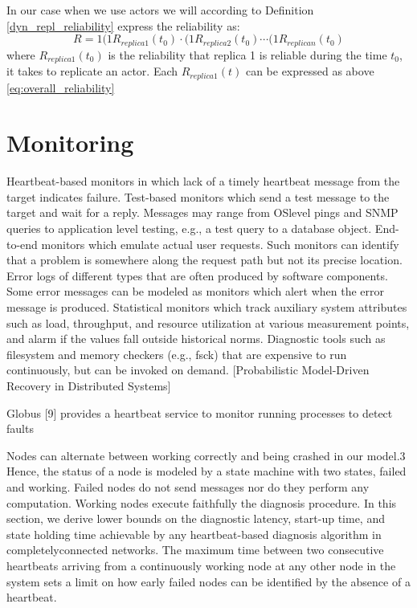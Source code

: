 \documentclass{cslthse-msc}
\begin{document}
In our case when we use actors we will according to Definition \ref{dyn_repl_reliability} express the reliability as:
\begin{equation} \label{eq:replica_reliability}
R = 1 (1 R_{replica 1}(t_0) \cdot (1 R_{replica 2}(t_0) \cdots (1 R_{replica n}(t_0)
\end{equation}
where $R_{replica 1}(t_0)$ is the reliability that replica 1 is reliable during the time $t_0$, it takes to replicate an actor. Each $R_{replica 1}(t)$ can be expressed as above \ref{eq:overall_reliability}

\section{Monitoring}
Heartbeat-based monitors in which lack of a timely heartbeat message from the target indicates failure.
Test-based monitors which send a test message to the target and wait for a reply. Messages may range from OSlevel pings and SNMP queries to application level testing, e.g., a test query to a database object.
End-to-end monitors which emulate actual user requests. Such monitors can identify that a problem is somewhere along the request path but not its precise location.
Error logs of different types that are often produced by software components. Some error messages can be modeled as monitors which alert when the error message is produced.
Statistical monitors which track auxiliary system attributes such as load, throughput, and resource utilization at various measurement points, and alarm if the values fall outside historical norms.
Diagnostic tools such as filesystem and memory checkers (e.g., fsck) that are expensive to run continuously, but can be invoked on demand. [Probabilistic Model-Driven Recovery in Distributed Systems]


Globus [9] provides a heartbeat service to monitor running processes to detect faults  \cite{effTaskReplMobGrid}

Nodes can alternate between working correctly and being crashed in our model.3 Hence, the status of a node is modeled by a state machine with two states, failed and working. Failed nodes do not send messages nor do they perform any computation. Working nodes execute faithfully the diagnosis procedure. In this section, we derive lower bounds on the diagnostic
latency, start-up time, and state holding time achievable by any heartbeat-based diagnosis algorithm in completelyconnected networks. The maximum time between two consecutive heartbeats arriving from a continuously working node at any other node in the system sets a limit on how early failed nodes can be identified by the absence of a heartbeat. \cite{distDiagnosis}
\end{document}
